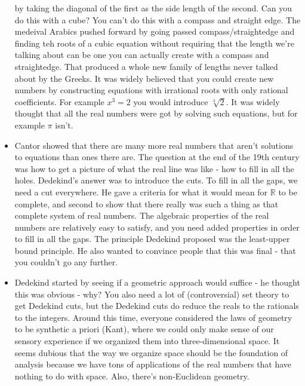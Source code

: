 \documentclass[12pt]{article}
\theoremstyle{definition}
\begin{document}
\begin{itemize}
        by taking the diagonal of the first as the side length of the second.
        Can you do this with a cube? You can't do this with a compass and
        straight edge. The medeival Arabics pushed forward by going passed
        compass/straightedge and finding teh roots of a cubic equation without
        requiring that the length we're talking about can be one you can
        actually create with a compass and straightedge. That produced a whole
        new family of lengths never talked about by the Greeks. It was widely
        believed that you could create new numbers by constructing equations
        with irrational roots with only rational coefficients. For example $x^3
        = 2$ you would introduce $\sqrt[3]{2}$. It was widely thought that all
        the real numbers were got by solving such equations, but for example
        $\pi$ isn't.
    \item
        Cantor showed that there are many more real numbers that aren't
        solutions to equations than ones there are. The question at the end of
        the 19th century was how to get a picture of what the real line was
        like - how to fill in all the holes. Dedekind's answer was to introduce
        the cuts. To fill in all the gaps, we need a cut everywhere. He gave a
        criteria for what it would mean for $\mathbb{R}$ to be complete, and
        second to show that there really was such a thing as that complete
        system of real numbers. The algebraic properties of the real numbers
        are relatively easy to satisfy, and you need added properties in order
        to fill in all the gaps. The principle Dedekind proposed was the
        least-upper bound principle. He also wanted to convince people that
        this was final - that you couldn't go any further.
    \item
        Dedekind started by seeing if a geometric approach would suffice - he
        thought this was obvious - why? You also need a lot of (controversial)
        set theory to get Dedekind cuts, but the Dedekind cuts do reduce the
        reals to the rationals to the integers. Around this time, everyone
        considered the laws of geometry to be synthetic a priori (Kant), where
        we could only make sense of our sensory experience if we organized them
        into three-dimensional space. It seems dubious that the way we organize
        space should be the foundation of analysis because we have tons of
        applications of the real numbers that have nothing to do with space.
        Also, there's non-Euclidean geometry.

\end{itemize}
\end{document}
